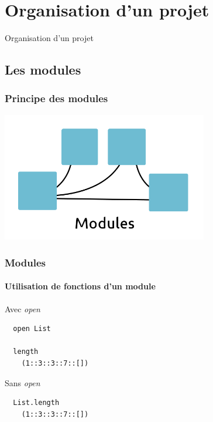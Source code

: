 \section{Organisation d'un projet}

\begin{frame}
	\begin{center}
		\huge
		Organisation d'un projet
	\end{center}
\end{frame}

\subsection{Les modules} %
\begin{frame}
	\frametitle{Principe des modules}
	\begin{center}
		\includegraphics[width=9cm]{pics/modules.png}
	\end{center}
\end{frame}

\begin{frame}[fragile]
	\frametitle{Modules}
	\framesubtitle{Utilisation de fonctions d'un module}
	\begin{block}{Avec \textit{open}}
		\begin{lstlisting}
  open List

  length 
    (1::3::3::7::[])
		\end{lstlisting}
	\end{block}
	\begin{block}{Sans \textit{open}}
		\begin{lstlisting}
  List.length 
    (1::3::3::7::[])
		\end{lstlisting}
	\end{block}
\end{frame}

